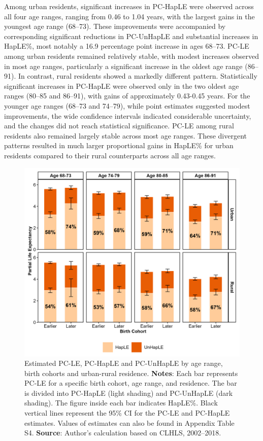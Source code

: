 \documentclass[12pt, a4paper]{article}
\begin{document}
Among urban residents, significant increases in PC-HapLE were observed across all four age ranges, ranging from 0.46 to 1.04 years, with the largest gains in the youngest age range (68–73). These improvements were accompanied by corresponding significant reductions in PC-UnHapLE and substantial increases in HapLE\%, most notably a 16.9 percentage point increase in ages 68–73. PC-LE among urban residents remained relatively stable, with modest increases observed in most age ranges, particularly a significant increase in the oldest age range (86–91). In contrast, rural residents showed a markedly different pattern. Statistically significant increases in PC-HapLE were observed only in the two oldest age ranges (80–85 and 86–91), with gains of approximately 0.43-0.45 years. For the younger age ranges (68–73 and 74–79), while point estimates suggested modest improvements, the wide confidence intervals indicated considerable uncertainty, and the changes did not reach statistical significance. PC-LE among rural residents also remained largely stable across most age ranges. These divergent patterns resulted in much larger proportional gains in HapLE\% for urban residents compared to their rural counterparts across all age ranges.

\begin{figure}[!p]
  \centering
  \includegraphics[width=1\textwidth]{fig_tabs_b300/2_4_HapLE_stacked_plots_urban.png}
  \caption{Estimated PC-LE, PC-HapLE and PC-UnHapLE by age range, birth cohorts and urban-rural residence. \textbf{Notes}: Each bar represents PC-LE for a specific birth cohort, age range, and residence. The bar is divided into PC-HapLE (light shading) and PC-UnHapLE (dark shading). The figure inside each bar indicates HapLE\%. Black vertical lines represent the 95\% CI for the PC-LE and PC-HapLE estimates. Values of estimates can also be found in Appendix Table S4. \textbf{Source}: Author's calculation based on CLHLS, 2002–2018.}
\end{figure}
\end{document}
